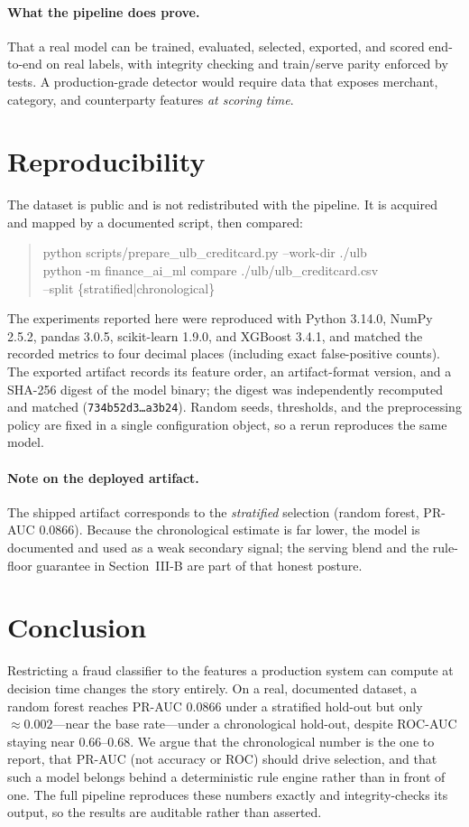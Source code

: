 \documentclass[conference]{IEEEtran}
\begin{document}
\paragraph{What the pipeline does prove.}
That a real model can be trained, evaluated, selected, exported, and scored
end-to-end on real labels, with integrity checking and train/serve parity
enforced by tests. A production-grade detector would require data that
exposes merchant, category, and counterparty features \emph{at scoring time}.

\section{Reproducibility}
The dataset is public and is not redistributed with the pipeline. It is
acquired and mapped by a documented script, then compared:
\begin{quote}
\small\ttfamily
python scripts/prepare\_ulb\_creditcard.py --work-dir ./ulb\\
python -m finance\_ai\_ml compare ./ulb/ulb\_creditcard.csv\\
\hspace*{1em}--split \{stratified|chronological\}
\end{quote}
The experiments reported here were reproduced with Python 3.14.0, NumPy
2.5.2, pandas 3.0.5, scikit-learn 1.9.0, and XGBoost 3.4.1, and matched the
recorded metrics to four decimal places (including exact false-positive
counts). The exported artifact records its feature order, an artifact-format
version, and a SHA-256 digest of the model binary; the digest was independently
recomputed and matched
(\texttt{734b52d3\ldots a3b24}). Random seeds, thresholds, and the
preprocessing policy are fixed in a single configuration object, so a rerun
reproduces the same model.

\paragraph{Note on the deployed artifact.}
The shipped artifact corresponds to the \emph{stratified} selection
(random forest, PR-AUC $0.0866$). Because the chronological estimate is far
lower, the model is documented and used as a weak secondary signal; the
serving blend and the rule-floor guarantee in Section~III-B are part of that
honest posture.

\section{Conclusion}
Restricting a fraud classifier to the features a production system can
compute at decision time changes the story entirely. On a real, documented
dataset, a random forest reaches PR-AUC $0.0866$ under a stratified hold-out
but only $\approx 0.002$---near the base rate---under a chronological
hold-out, despite ROC-AUC staying near $0.66$--$0.68$. We argue that the
chronological number is the one to report, that PR-AUC (not accuracy or ROC)
should drive selection, and that such a model belongs behind a deterministic
rule engine rather than in front of one. The full pipeline reproduces these
numbers exactly and integrity-checks its output, so the results are auditable
rather than asserted.
\end{document}

